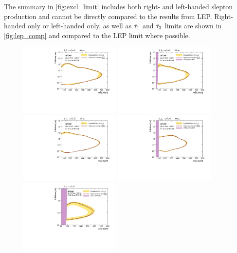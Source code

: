 The summary in \autoref{fig:excl_limit} includes both right- and left-handed slepton production and cannot be directly compared to the results from \ac{LEP}. Right-handed only or left-handed only, as well as $\tilde{\tau}_1$ and $\tilde{\tau}_2$ limits are shown in \autoref{fig:lep_comp} and compared to the LEP limit where possible.

\begin{figure}[!ht]
    \centering
        \includegraphics[width=0.45\textwidth]{figures/limits/SRee_Slepleft.pdf}
        \includegraphics[width=0.45\textwidth]{figures/limits/SRee_Slepright.pdf}
        \includegraphics[width=0.45\textwidth]{figures/limits/SRmm_Slepleft.pdf}
        \includegraphics[width=0.45\textwidth]{figures/limits/SRmm_Slepright.pdf}
        \includegraphics[width=0.45\textwidth]{figures/limits/Stauleft.pdf}

\end{figure}
